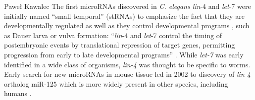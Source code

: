 \begin{artengenv}{Paweł Kawalec}
The first microRNAs discovered in \textit{C. elegans lin}-4 and \textit{let}-7 were initially named ``small temporal'' (stRNAs) to emphasize the fact that they are developmentally regulated as well as they control developmental programs
\parencite[][]{lagos-quintana_identification_2002}, %
 such as Dauer larva or vulva formation: ``\textit{lin}-4 and \textit{let}-7 control the timing of postembryonic events by translational repression of target genes, permitting progression from early to late developmental programs'' 
\parencite[][p.9]{sempere_temporal_2003}. %
 While \textit{let-7} was early identified in a wide class of organisms, \textit{lin-4} was thought to be specific to worms. Early search for new microRNAs in mouse tissue led in 2002 to discovery of \textit{lin-4} ortholog miR-125 which is more widely present in other species, including humans 
\parencite[][]{yin_progress_2015}. %



\end{artengenv}
